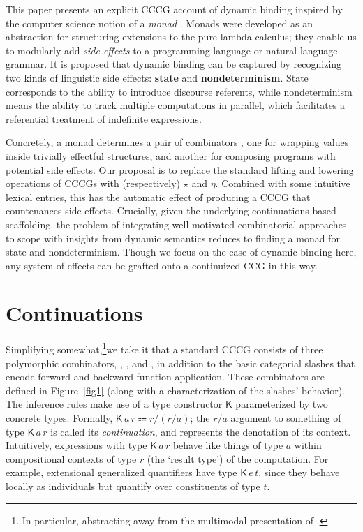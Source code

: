  This paper presents an explicit CCCG account of dynamic binding inspired by the computer science notion of a \emph{monad} \citep[e.g.][]{Moggi:1989, Wadler:1992, Wadler:1994, Wadler:1995, Shan:2002}. Monads were developed as an abstraction for structuring extensions to the pure lambda calculus; they enable us to modularly add \emph{side effects} \citep[cf.][]{Shan:2005} to a programming language or natural language grammar. It is proposed that dynamic binding can be captured by recognizing two kinds of linguistic side effects: \textbf{state} and \textbf{nondeterminism}. State corresponds to the ability to introduce discourse referents, while nondeterminism means the ability to track multiple computations in parallel, which facilitates a referential treatment of indefinite expressions. %
	
  Concretely, a monad determines a pair of combinators \ab{\eta,\,\star}, one for wrapping values inside trivially effectful structures, and another for composing programs with potential side effects. Our proposal is to replace the standard lifting and lowering operations of CCCGs with (respectively) $\star$ and $\eta$. Combined with some intuitive lexical entries, this has the automatic effect of producing a CCCG that countenances side effects. Crucially, given the underlying continuations-based scaffolding, the problem of integrating well-motivated combinatorial approaches to scope with insights from dynamic semantics reduces to finding a monad for state and nondeterminism. Though we focus on the case of dynamic binding here, any system of effects can be grafted onto a continuized CCG in this way.%

\section{Continuations}
  Simplifying somewhat,\footnote{In particular, abstracting away from the multimodal presentation of \citealt{ShanBarker:2006, BarkerShan:2008, BarkerShan:2014}.}we take it that a standard CCCG consists of three polymorphic combinators, , , and , in addition to the basic categorial slashes that encode forward and backward function application. These combinators are defined in Figure~\ref{fig1} (along with a characterization of the slashes' behavior). The inference rules make use of a type constructor $\textsf{K}$ parameterized by two concrete types. Formally, $\textsf{K}\,a\,r \Coloneqq r/(r/a)$; the $r/a$ argument to something of type $\textsf{K}\,a\,r$ is called its \emph{continuation}, and represents the denotation of its context. Intuitively, expressions with type $\textsf{K}\,a\,r$ behave like things of type $a$ within compositional contexts of type $r$ (the `result type') of the computation. For example, extensional generalized quantifiers have type $\textsf{K}\,e\,t$, since they behave locally as individuals but quantify over constituents of type $t$.%

